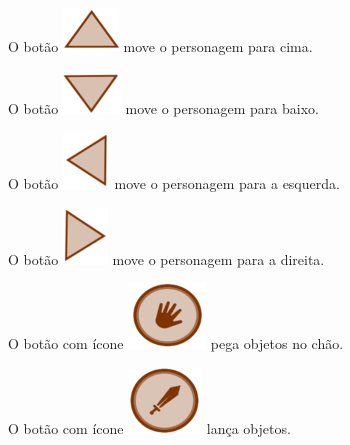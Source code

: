 \begin{alineascomponto}

	\item O botão \includegraphics[scale=0.5]{figuras/cima} move o personagem para cima.\\
	
	\item O botão \includegraphics[scale=0.5]{figuras/baixo} move o personagem para baixo.\\
	
	\item O botão \includegraphics[scale=0.5]{figuras/esquerda} move o personagem para a esquerda.\\ 
	
	\item O botão \includegraphics[scale=0.5]{figuras/direita} move o personagem para a direita.\\
	
	\item O botão com ícone \includegraphics[scale=0.5]{figuras/mao} pega objetos no chão.\\
	
	\item O botão com ícone \includegraphics[scale=0.5]{figuras/espada} lança objetos.\\
	

\end{alineascomponto}
